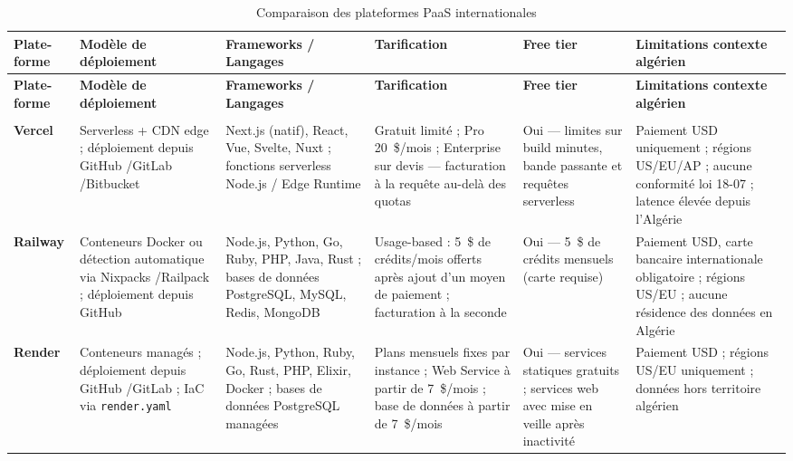 \small
\setlength{\tabcolsep}{3pt}
\begin{longtable}{|>{\raggedright\arraybackslash}p{1.5cm}|>{\raggedright\arraybackslash}p{1.8cm}|>{\raggedright\arraybackslash}p{2.2cm}|>{\raggedright\arraybackslash}p{2.0cm}|>{\raggedright\arraybackslash}p{1.7cm}|>{\raggedright\arraybackslash}p{2.6cm}|}
\caption{Comparaison des plateformes PaaS internationales}
\label{tab:paas-internationales} \\

\hline
\textbf{Plate-}\textbf{forme} & \textbf{Modèle de déploiement} & \textbf{Frameworks / Langages} & \textbf{Tarification} & \textbf{Free tier} & \textbf{Limitations contexte algérien} \\
\hline
\endfirsthead

\hline
\textbf{Plate-}\textbf{forme} & \textbf{Modèle de déploiement} & \textbf{Frameworks / Langages} & \textbf{Tarification} & \textbf{Free tier} & \textbf{Limitations contexte algérien} \\
\hline
\endhead

\hline
\multicolumn{6}{r|}{\small\textit{Suite à la page suivante}} \\
\endfoot

\hline
\endlastfoot

\textbf{Vercel}
  & Serverless + CDN edge ; déploiement depuis GitHub /GitLab /Bitbucket
  & Next.js (natif), React, Vue, Svelte, Nuxt ; fonctions serverless Node.js / Edge Runtime
  & Gratuit limité ; Pro 20~\$/mois ; Enterprise sur devis — facturation à la requête au-delà des quotas
  & Oui — limites sur build minutes, bande passante et requêtes serverless
  & Paiement USD uniquement ; régions US/EU/AP ; aucune conformité loi 18-07 ; latence élevée depuis l'Algérie \cite{paas-comparison} \\
\hline

\textbf{Railway}
  & Conteneurs Docker ou détection automatique via Nixpacks /Railpack ; déploiement depuis GitHub
  & Node.js, Python, Go, Ruby, PHP, Java, Rust ; bases de données PostgreSQL, MySQL, Redis, MongoDB
  & Usage-based : 5~\$ de crédits/mois offerts après ajout d'un moyen de paiement ; facturation à la seconde
  & Oui — 5~\$ de crédits mensuels (carte requise)
  & Paiement USD, carte bancaire internationale obligatoire ; régions US/EU ; aucune résidence des données en Algérie \cite{heroku-alternatives} \\
\hline

\textbf{Render}
  & Conteneurs managés ; déploiement depuis GitHub /GitLab ; IaC via \texttt{render.yaml}
  & Node.js, Python, Ruby, Go, Rust, PHP, Elixir, Docker ; bases de données PostgreSQL managées
  & Plans mensuels fixes par instance ; Web Service à partir de 7~\$/mois ; base de données à partir de 7~\$/mois
  & Oui — services statiques gratuits ; services web avec mise en veille après inactivité
  & Paiement USD ; régions US/EU uniquement ; données hors territoire algérien \cite{heroku-alternatives} \\
\hline


\end{longtable}
